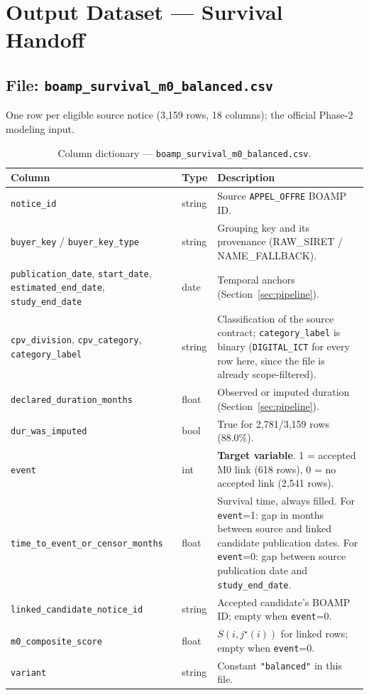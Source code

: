 \documentclass[11pt]{article}
\begin{document}
\section{Output Dataset --- Survival Handoff}
\label{sec:output}

\subsection{File: \texttt{boamp\_survival\_m0\_balanced.csv}}
One row per eligible source notice (3{,}159 rows, 18 columns); the official
Phase-2 modeling input.

\begin{table}[h!]
\centering
\caption{Column dictionary --- \texttt{boamp\_survival\_m0\_balanced.csv}.}
\small
\begin{tabular}{p{}p{}p{}}
\toprule
Column & Type & Description \\
\midrule
\texttt{notice\_id} & string & Source \texttt{APPEL\_OFFRE} BOAMP ID. \\
\texttt{buyer\_key} / \texttt{buyer\_key\_type} & string & Grouping key and its provenance (RAW\_SIRET / NAME\_FALLBACK). \\
\texttt{publication\_date}, \texttt{start\_date}, \texttt{estimated\_end\_date}, \texttt{study\_end\_date} & date & Temporal anchors (Section~\ref{sec:pipeline}). \\
\texttt{cpv\_division}, \texttt{cpv\_category}, \texttt{category\_label} & string & Classification of the source contract; \texttt{category\_label} is binary (\texttt{DIGITAL\_ICT} for every row here, since the file is already scope-filtered). \\
\texttt{declared\_duration\_months} & float & Observed or imputed duration (Section~\ref{sec:pipeline}). \\
\texttt{dur\_was\_imputed} & bool & True for 2{,}781/3{,}159 rows (88.0\%). \\
\texttt{event} & int & \textbf{Target variable}. 1 = accepted M0 link (618 rows), 0 = no accepted link (2{,}541 rows). \\
\texttt{time\_to\_event\_or\_censor\_months} & float & Survival time, always filled. For \texttt{event}=1: gap in months between source and linked candidate publication dates. For \texttt{event}=0: gap between source publication date and \texttt{study\_end\_date}. \\
\texttt{linked\_candidate\_notice\_id} & string & Accepted candidate's BOAMP ID; empty when \texttt{event}=0. \\
\texttt{m0\_composite\_score} & float & $S(i,j^{\star}(i))$ for linked rows; empty when \texttt{event}=0. \\
\texttt{variant} & string & Constant \texttt{"balanced"} in this file. \\
\bottomrule
\end{tabular}
\end{table}
\end{document}
